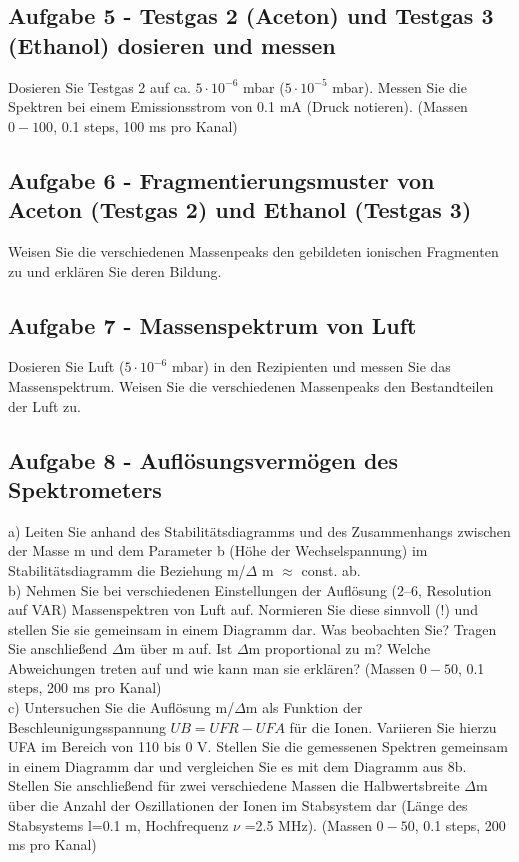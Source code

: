 \subsection*{Aufgabe 5 - Testgas 2 (Aceton) und Testgas 3 (Ethanol) dosieren und messen}
Dosieren Sie Testgas 2 auf ca. $5 \cdot 10^{-6}$ mbar ($5 \cdot 10^{-5}$ mbar). Messen Sie die Spektren bei einem Emissionsstrom von 0.1 mA (Druck notieren). (Massen $0-100$, 0.1 steps, 100 ms pro Kanal) 

\subsection*{Aufgabe 6 - Fragmentierungsmuster von Aceton (Testgas 2) und Ethanol (Testgas 3)}
Weisen Sie die verschiedenen Massenpeaks den gebildeten ionischen Fragmenten zu und erklären Sie deren Bildung.

\subsection*{Aufgabe 7 - Massenspektrum von Luft} 
Dosieren Sie Luft ($5 \cdot 10^{-6}$ mbar) in den Rezipienten und messen Sie das Massenspektrum. Weisen Sie die verschiedenen Massenpeaks den Bestandteilen der Luft zu. 

\subsection*{Aufgabe 8 - Auflösungsvermögen des Spektrometers} 
a) Leiten Sie anhand des Stabilitätsdiagramms und des Zusammenhangs zwischen der Masse m und dem Parameter b (Höhe der Wechselspannung) im Stabilitätsdiagramm die Beziehung m/$\Delta$ m $\approx$ const. ab.\\

b) Nehmen Sie bei verschiedenen Einstellungen der Auflösung ($2 – 6$, Resolution auf VAR) Massenspektren von Luft auf. Normieren Sie diese sinnvoll (!) und stellen Sie sie 
gemeinsam in einem Diagramm dar. Was beobachten Sie? Tragen Sie anschließend $\Delta$m über m auf. Ist $\Delta$m proportional zu m? Welche Abweichungen treten auf und wie 
kann man sie erklären? (Massen $0-50$, 0.1 steps, 200 ms pro Kanal)\\

c) Untersuchen Sie die Auflösung m/$\Delta$m als Funktion der Beschleunigungsspannung $UB = UFR - UFA$ für die Ionen. Variieren Sie hierzu UFA im Bereich von 110 bis 0 V. Stellen Sie die gemessenen Spektren gemeinsam in einem Diagramm dar und vergleichen Sie es mit dem Diagramm aus 8b. Stellen Sie anschließend für zwei verschiedene Massen die Halbwertsbreite $\Delta$m über die Anzahl der Oszillationen der Ionen im Stabsystem dar (Länge des Stabsystems l=0.1 m, Hochfrequenz $\nu$ =2.5 MHz). (Massen $0-50$, 0.1 steps, 200 ms pro Kanal) 
